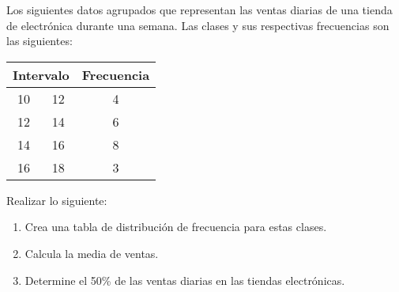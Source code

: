 \begin{exercise}
    Los siguientes datos agrupados que representan las ventas diarias de una tienda de electrónica durante una semana.
    Las clases y sus respectivas frecuencias son las siguientes:
    \begin{table}[H]
        \centering
        \begin{tabular}{|c|c|c|}
            \hline
            \multicolumn{2}{|c|}{Intervalo} & \multicolumn{1}{|c|}{Frecuencia}\\
            \hline\hline
            10 & 12 & 4 \\\hline
            12 & 14 & 6 \\\hline
            14 & 16 & 8 \\\hline
            16 & 18 & 3 \\\hline
        \end{tabular}
    \end{table}
    Realizar lo siguiente:
    \begin{enumerate}
        \item Crea una tabla de distribución de frecuencia para estas clases.
        \item Calcula la media de ventas.
        \item Determine el 50\% de las ventas diarias en las tiendas electrónicas.
    \end{enumerate}
\end{exercise}
